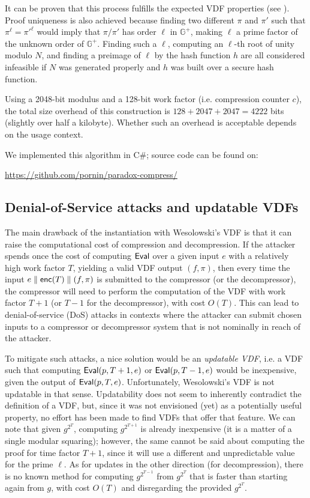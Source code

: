 \documentclass{llncs}
\newcommand{\bG}{\mathbb{G}}
\newcommand{\cc}{\text{\textsf{enc}}}
\newcommand{\Eval}{\text{\textsf{Eval}}}
\begin{document}
It can be proven that this process fulfills the expected VDF properties
(see \cite{Wes2019,BonBunFis2018}). Proof uniqueness is also achieved
because finding two different $\pi$ and $\pi'$ such that $\pi^\ell =
\pi'^\ell$ would imply that $\pi / \pi'$ has order $\ell$ in $\bG^+$,
making $\ell$ a prime factor of the unknown order of $\bG^+$. Finding
such a $\ell$, computing an $\ell$-th root of unity modulo $N$, and
finding a preimage of $\ell$ by the hash function $h$ are all considered
infeasible if $N$ was generated properly and $h$ was built over a secure
hash function.

Using a 2048-bit modulus and a 128-bit work factor (i.e. compression
counter $c$), the total size overhead of this construction is $128 +
2047 + 2047 = 4222$ bits (slightly over half a kilobyte). Whether such
an overhead is acceptable depends on the usage context.

We implemented this algorithm in C\#; source code can be found on:
\begin{center}
    \url{https://github.com/pornin/paradox-compress/}
\end{center}

\subsection{Denial-of-Service attacks and updatable VDFs}

The main drawback of the instantiation with Wesolowski's VDF is that it
can raise the computational cost of compression and decompression. If
the attacker spends once the cost of computing $\Eval$ over a given
input $e$ with a relatively high work factor $T$, yielding a valid VDF
output $(f, \pi)$, then every time the input $e \parallel \cc(T)
\parallel (f, \pi)$ is submitted to the compressor (or the
decompressor), the compressor will need to perform the computation of
the VDF with work factor $T+1$ (or $T-1$ for the decompressor), with
cost $O(T)$. This can lead to denial-of-service (DoS) attacks in
contexts where the attacker can submit chosen inputs to a compressor or
decompressor system that is not nominally in reach of the attacker.

To mitigate such attacks, a nice solution would be an \emph{updatable
VDF}, i.e. a VDF such that computing $\Eval(p, T+1, e)$ or $\Eval(p,
T-1, e)$ would be inexpensive, given the output of $\Eval(p, T, e)$.
Unfortunately, Wesolowski's VDF is not updatable in that sense.
Updatability does not seem to inherently contradict the definition of a
VDF, but, since it was not envisioned (yet) as a potentially useful
property, no effort has been made to find VDFs that offer that feature.
We can note that given $g^{2^T}$, computing $g^{2^{T+1}}$ is already
inexpensive (it is a matter of a single modular squaring); however, the
same cannot be said about computing the proof for time factor $T+1$,
since it will use a different and unpredictable value for the prime
$\ell$. As for updates in the other direction (for decompression), there
is no known method for computing $g^{2^{T-1}}$ from $g^{2^T}$ that is
faster than starting again from $g$, with cost $O(T)$ and disregarding
the provided $g^{2^T}$.
\end{document}
